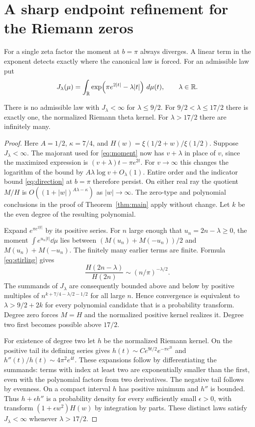 \section{A sharp endpoint refinement for the Riemann zeros}\label{sec:weighted}
For a single zeta factor the moment at $b=\pi$ always diverges. A linear term in the exponent detects exactly where the canonical law is forced. For an admissible law put
\[
  J_\lambda(\mu)=\int_{\mathbb R}
          \exp\!\left(\pi e^{2|t|}-\lambda |t|\right)\,d\mu(t),
          \qquad \lambda\in\mathbb R .
\]
\begin{theorem}
There is no admissible law with $J_\lambda<\infty$ for $\lambda\le9/2$. For $9/2<\lambda\le17/2$ there is exactly one, the normalized Riemann theta kernel. For $\lambda>17/2$ there are infinitely many.
\end{theorem}
\begin{proof}
Here $A=1/2$, $\kappa=7/4$, and $H(w)=\xi(1/2+w)/\xi(1/2)$. Suppose $J_\lambda<\infty$. The majorant used for \eqref{eq:moment} now has $v+\lambda$ in place of $v$, since the maximized expression is $(v+\lambda)t-\pi e^{2t}$. For $v\to\infty$ this changes the logarithm of the bound by $A\lambda\log v+O_\lambda(1)$. Entire order and the indicator bound \eqref{eq:direction} at $b=\pi$ therefore persist. On either real ray the quotient $M/H$ is $O((1+|w|)^{A\lambda-\kappa})$ as $|w|\to\infty$. The zero-type and polynomial conclusions in the proof of Theorem~\ref{thm:main} apply without change. Let $k$ be the even degree of the resulting polynomial.

Expand $e^{\pi e^{2|t|}}$ by its positive series. For $n$ large enough that $u_n=2n-\lambda\ge0$, the moment $\int e^{u_n |t|}\dd\mu$ lies between $(M(u_n)+M(-u_n))/2$ and $M(u_n)+M(-u_n)$. The finitely many earlier terms are finite. Formula \eqref{eq:stirling} gives
\[
 \frac{H(2n-\lambda)}{H(2n)}
      \sim (n/\pi)^{-\lambda/2} .
\]
The summands of $J_\lambda$ are consequently bounded above and below by positive multiples of $n^{k+7/4-\lambda/2-1/2}$ for all large $n$. Hence convergence is equivalent to $\lambda>9/2+2k$ for every polynomial candidate that is a probability transform. Degree zero forces $M=H$ and the normalized positive kernel realizes it. Degree two first becomes possible above $17/2$.

For existence of degree two let $h$ be the normalized Riemann kernel. On the positive tail its defining series gives $h(t)\sim C e^{9t/2}e^{-\pi e^{2t}}$ and $h''(t)/h(t)\sim4\pi^2 e^{4t}$. These expansions follow by differentiating the summands: terms with index at least two are exponentially smaller than the first, even with the polynomial factors from two derivatives. The negative tail follows by evenness. On a compact interval $h$ has positive minimum and $h''$ is bounded. Thus $h+\epsilon h''$ is a probability density for every sufficiently small $\epsilon>0$, with transform $(1+\epsilon w^2)H(w)$ by integration by parts. These distinct laws satisfy $J_\lambda<\infty$ whenever $\lambda>17/2$.
\end{proof}
